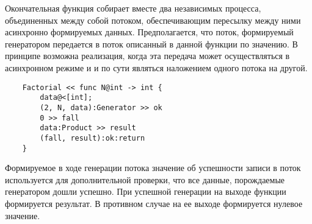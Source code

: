 Окончательная функция собирает вместе два независимых процесса, объединенных между собой потоком, обеспечивающим пересылку между ними асинхронно формируемых данных.
Предполагается, что поток, формируемый генератором передается в поток описанный в данной функции по значению. В принципе возможна реализация, когда эта передача может осуществляться в асинхронном режиме и и по сути являться наложением одного потока на другой.
\begin{verbatim}
    Factorial << func N@int -> int {
        data@<[int];
        (2, N, data):Generator >> ok
        0 >> fall
        data:Product >> result
        (fall, result):ok:return
    }
\end{verbatim}
Формируемое в ходе генерации потока значение об успешности записи в поток используется для дополнительной проверки, что все данные, порождаемые генератором дошли успешно. При успешной генерации на выходе функции формируется результат. В противном случае на ее выходе формируется нулевое значение.